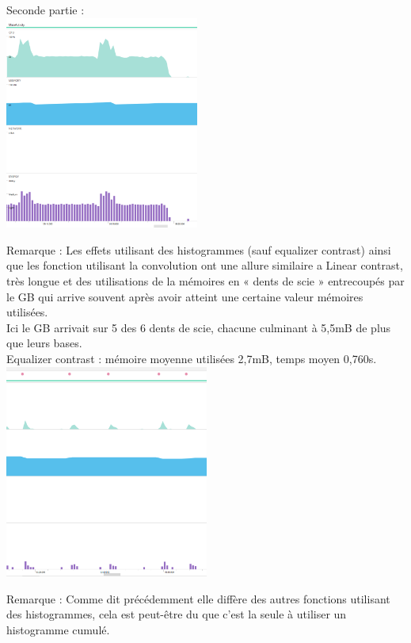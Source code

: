 \documentclass[12pt]{article}
\begin{document}
\begin{itemize}
 \bigskip
Seconde partie :\\
 \bigskip
    \includegraphics[width=\textwidth, height = 7cm]{linelong2}

    Remarque : 
    Les effets utilisant des histogrammes (sauf equalizer contrast) ainsi que les fonction utilisant la convolution ont une allure similaire a Linear contrast, très longue et des utilisations de la mémoires en « dents de scie » entrecoupés par le GB qui arrive souvent après avoir atteint une certaine valeur mémoires utilisées.\\
    Ici le GB arrivait sur 5 des 6 dents de scie, chacune culminant à 5,5mB de plus que leurs bases.\\

 

    Equalizer contrast : mémoire moyenne utilisées 2,7mB, temps moyen 0,760s.\\





    \includegraphics[width=\textwidth, height = 7cm]{egalisateur}



    Remarque :
    Comme dit précédemment elle diffère des autres fonctions utilisant des histogrammes, cela est peut-être du que c'est la seule à utiliser un histogramme cumulé.\\


\end{itemize}
\end{document}
